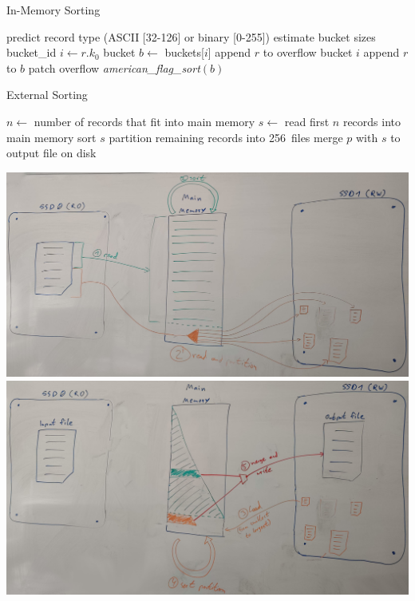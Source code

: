 \documentclass[a1paper,portrait,american,fontscale=.4]{baposter}
\begin{document}
\clearpage
\todos

\begin{algorithm}
    \caption{In-Memory Sorting}
    \begin{algorithmic}
        \State predict record type (ASCII [32-126] or binary [0-255])
        \State estimate bucket sizes
         
            \State bucket\_id $i \gets r.k_0$
            \State bucket $b \gets$ buckets[$i$] 
             
                \State append $r$ to overflow bucket $i$
            \Else
                \State append $r$ to $b$
            \EndIf
        \EndFor
        \State patch overflow
         
            \State \emph{american\_flag\_sort}$(b)$
        \EndFor
    \end{algorithmic}
\end{algorithm}

\begin{algorithm}
    \caption{External Sorting}
    \begin{algorithmic}
        \State $n \gets$ number of records that fit into main memory
        \State $s \gets$ read first $n$ records into main memory
        \State sort $s$ 
        \State partition remaining records into 256~files
            \State merge $p$ with $s$ to output file on disk
        \EndFor
    \end{algorithmic}
\end{algorithm}

\begin{center}
    \includegraphics[scale=.5]{fig/external_sort_1.jpg}
    \includegraphics[scale=.5]{fig/external_sort_2.jpg}
\end{center}
\end{document}

